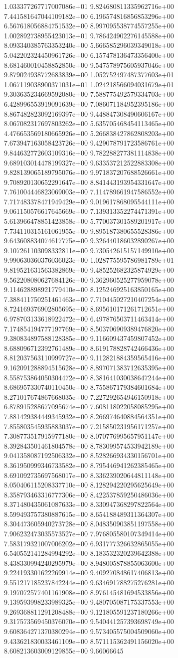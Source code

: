 	1.033377267717007086e+01	9.824680811335962716e+00	7.441581647044109182e+00	6.196574816856853296e+00	6.567618056884751532e+00	8.997095538774557255e+00	1.002892738955423013e+01	9.786424902276145588e+00	8.093340385763353240e+00	5.666585296039349018e+00	5.042202324450961726e+00	6.157478136473356400e+00	8.681460010458852850e+00	9.547578975605937046e+00	9.879024938772683839e+00	1.052752497487377603e+01	1.067119038900371031e+01	1.024218566094031679e+01	9.303635234669592080e+00	7.588775492579334703e+00	6.428996553919091639e+00	7.086071184952395186e+00	8.867482823092169397e+00	9.448847308490606167e+00	8.067082317697803262e+00	5.635705468454113465e+00	4.476653569180665926e+00	5.266838427862808203e+00	7.673947163058423726e+00	9.429078791723586761e+00	9.844632772603109316e+00	9.782288277381114838e+00	9.689103014478199327e+00	9.633537212522883308e+00	9.828139065189795076e+00	9.971837207688526661e+00	9.708920130652291647e+00	8.841443193954331647e+00	7.761004446823069003e+00	7.114789661947586552e+00	7.717483378471949429e+00	9.019617868095544111e+00	9.061150576617645669e+00	7.139313352274471391e+00	5.613966478851423858e+00	5.770037301589201917e+00	7.734110315161061955e+00	9.895187380655528386e+00	9.643608834074617775e+00	9.326440186032890267e+00	9.107261103098332811e+00	9.730542615157149910e+00	9.990630360376036023e+00	1.028775595786981789e+01	9.819521631563382869e+00	9.485252682325874929e+00	9.562208080627684126e+00	9.362960525277959078e+00	9.114628898921779410e+00	8.125246925163850165e+00	7.388411750251461463e+00	7.710445027210407254e+00	8.724169376902805695e+00	8.695610171261712651e+00	6.978703133618922472e+00	6.497876503711463414e+00	7.174854194777197769e+00	8.503706909389476820e+00	9.380834897588128385e+00	9.116609437459807452e+00	8.688096712392761489e+00	8.619178828742466436e+00	8.812037563110999727e+00	9.112821884359565416e+00	9.162091288894515628e+00	8.897071383712635395e+00	8.558753864050304472e+00	8.381641030038647244e+00	8.686957330740110450e+00	8.755867179384601684e+00	8.271017674867668035e+00	7.227292654946150918e+00	6.878915288677095674e+00	7.608118022058085295e+00	7.881429384449345932e+00	8.266974640884564351e+00	7.855803545935883037e+00	7.215850231956171257e+00	7.308773517915977180e+00	8.070776995657951147e+00	8.392843501461804578e+00	8.783099574533942189e+00	9.041358087192506332e+00	8.528266934330156701e+00	8.361950999346733582e+00	8.795446941262385465e+00	8.691092735697568017e+00	8.336239020644811148e+00	8.050406115208337710e+00	8.128294220295625649e+00	8.358793463316777306e+00	8.422537859250486036e+00	8.371480435061087633e+00	8.330947368297822564e+00	8.599493757380887615e+00	8.654188489311364307e+00	8.304473605940273728e+00	8.048350903851197558e+00	7.906232473035573527e+00	7.976805580107349414e+00	7.583179321007006202e+00	6.931777326632865055e+00	6.540552141284994292e+00	8.183532320239642388e+00	8.438330994240295979e+00	8.948005878855063600e+00	9.224193301622269914e+00	9.409270848617406813e+00	9.551217185237842244e+00	9.634691788275276281e+00	9.197072577401161908e+00	8.976145481694533856e+00	9.139593998233989325e+00	9.480705087175337553e+00	9.269368811291208488e+00	9.121805591237180266e+00	9.317573569450376070e+00	9.540441257393698749e+00	9.608364271370380294e+00	9.573405575004509060e+00	9.433621830033461109e+00	8.571115362491156020e+00	8.608213603009129855e+00	9.66066645